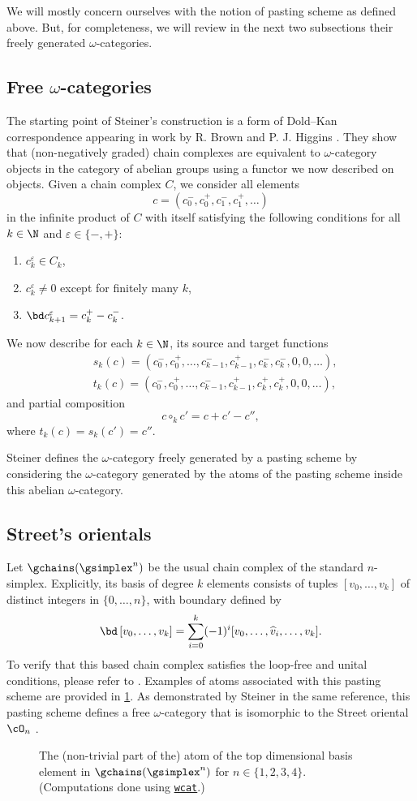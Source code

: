 We will mostly concern ourselves with the notion of pasting scheme as defined above.
But, for completeness, we will review in the next two subsections their freely generated $\omega$-categories.

\subsection{Free $\omega$-categories}

The starting point of Steiner's construction is a form of Dold--Kan correspondence appearing in work by R. Brown and P. J. Higgins \cite{brown1981cubes}.
They show that (non-negatively graded) chain complexes are equivalent to $\omega$-category objects in the category of abelian groups using a functor we now described on objects.
Given a chain complex $C$, we consider all elements
\[
c = (c_0^-,c_0^+,c_1^-,c_1^+,\dots)
\]
in the infinite product of $C$ with itself satisfying the following conditions for all $k \in \N$ and $\varepsilon \in \{-,+\}$:
\begin{enumerate}
	\item $c_k^\varepsilon \in C_k$,
	\item $c_k^\varepsilon \neq 0$ except for finitely many $k$,
	\item $\bd c_{k+1}^\varepsilon = c_k^+ - c_k^-$.
\end{enumerate}
We now describe for each $k \in \N$, its source and target functions
\begin{align*}
	&s_k(c) = (c_0^-,c_0^+,\dots,c_{k-1}^-,c_{k-1}^+,c_k^-,c_k^-,0,0,\dots),\\
	&t_k(c) = (c_0^-,c_0^+,\dots,c_{k-1}^-,c_{k-1}^+,c_k^+,c_k^+,0,0,\dots),
\end{align*}
and partial composition
\[
c \circ_k c' = c+c'-c'',
\]
where $t_k(c) = s_k(c') = c''$.

Steiner defines the $\omega$-category freely generated by a pasting scheme by considering the $\omega$-category generated by the atoms of the pasting scheme inside this abelian $\omega$-category.

\subsection{Street's orientals}\label{ss:orientals}

Let $\gchains(\gsimplex^n)$ be the usual chain complex of the standard $n$-simplex.
Explicitly, its basis of degree $k$ elements consists of tuples $[v_0,\dots,v_k]$ of distinct integers in $\{0,\dots,n\}$, with boundary defined by
\[
\bd\, [v_0,\dots,v_k] = \sum_{i=0}^k (-1)^i [v_0,\dots,\widehat{v}_i,\dots,v_k].
\]
To verify that this based chain complex satisfies the loop-free and unital conditions, please refer to \cite[Example 3.8]{steiner2004omega}.
Examples of atoms associated with this pasting scheme are provided in \cref{f:street}.
As demonstrated by Steiner in the same reference, this pasting scheme defines a free $\omega$-category that is isomorphic to the Street oriental $\cO_n$ \cite{street1987orientals}.

\begin{figure}
	\centering
	
	\caption{The (non-trivial part of the) atom of the top dimensional basis element in $\gchains(\gsimplex^n)$ for $n \in \{1,2,3,4\}$. (Computations done using \href{https://github.com/ammedmar/wcat}{\texttt{wcat}}.)}
	\label{f:street}
\end{figure}